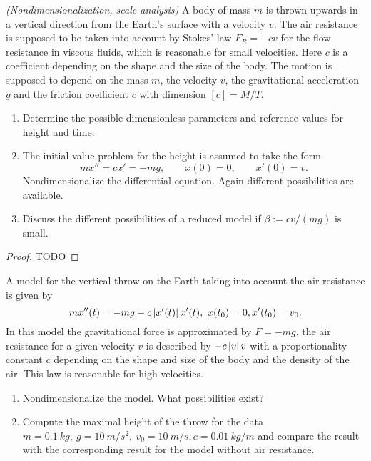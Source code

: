 \begin{ex}
  [1.5]

  \textit{(Nondimensionalization, scale analysis)} A body of mass $m$ is thrown
  upwards in a vertical direction from the Earth’s surface with a velocity $v$.
  The air resistance is supposed to be taken into account by Stokes' law $F_R =
  -cv$ for the flow resistance in viscous fluids, which is reasonable for small
  velocities. Here $c$ is a coefficient depending on the shape and the size of
  the body. The motion is supposed to depend on the mass $m$, the velocity $v$,
  the gravitational acceleration $g$ and the friction coefficient $c$ with
  dimension $[c] = M/T$.

  \begin{enumerate}
    \item Determine the possible dimensionless parameters and reference values
      for height and time.
    \item The initial value problem for the height is assumed to take the form
      \[
      m x'' = c x' = -m g,\qquad x(0) = 0,\qquad x'(0) = v.
      \]
      Nondimensionalize the differential equation. Again different
      possibilities are available.
    \item Discuss the different possibilities of a reduced model if $\beta :=
      cv / (m g)$ is small.
  \end{enumerate}
\end{ex}

\begin{proof}
  TODO
\end{proof}



\begin{ex}
  [1.6]
  \label{ex:1.6}

  A model for the vertical throw on the Earth taking into account the air
  resistance is given by
  \[
    mx''(t) = -mg  - c\left\vert{x'(t)}\right\vert x'(t),\ x(t_0) = 0, x'(t_0) = v_0.
  \]
  In this model the gravitational force is approximated by $F = -mg$, the air
  resistance for a given velocity $v$ is described by $-c\left\vert{v}\right\vert v$ with a
  proportionality constant $c$ depending on the shape and size of the body and
  the density of the air. This law is reasonable for high velocities.
  \begin{enumerate}
    \item Nondimensionalize the model. What possibilities exist?
    \item Compute the maximal height of the throw for the data $m =
      \SI{0.1}{kg},\ g = \SI{10}{m\per s^2},\ v_0 = \SI{10}{m \per s}, c =
      \SI{0.01}{kg\per m}$ and compare the result with the corresponding result
      for the model without air resistance.
  \end{enumerate}
  
\end{ex}



